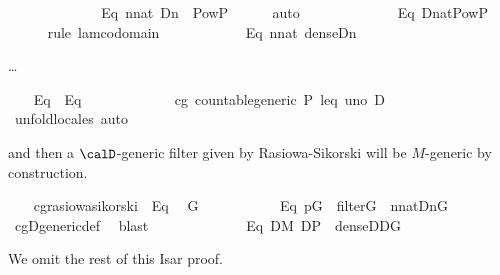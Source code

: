 \begin{isabellebody}
\isanewline
\ \ \isamarkupfalse%
\ \isanewline
\ \ \ \ \ \ \ \ \ Eq{}{\isacharcolon}\ {\isachardoublequoteopen}{\isasymforall}n{\isasymin}nat{\isachardot}\ {\isacharquery}D{\isacharbackquote}n\ {\isasymin}\ Pow{\isacharparenleft}P{\isacharparenright}{\isachardoublequoteclose}\isanewline
\ \ \ \ \isamarkupfalse%
\ auto\isanewline
\ \ \isamarkupfalse%
\ \isamarkupfalse%
\isanewline
\ \ \ \ \ \ \ \ \ Eq{}{\isacharcolon}\ {\isachardoublequoteopen}{\isacharquery}D{\isacharcolon}nat{\isasymrightarrow}Pow{\isacharparenleft}P{\isacharparenright}{\isachardoublequoteclose}\isanewline
\ \ \ \ \isamarkupfalse%
\ {\isacharparenleft}rule\ lam{\isacharunderscore}codomain{\isacharparenright}\isanewline
\ \ \isamarkupfalse%
\isanewline
\ \ \ \ \ \ \ \ \ Eq{}{\isacharcolon}\ {\isachardoublequoteopen}{\isasymforall}n{\isasymin}nat{\isachardot}\ dense{\isacharparenleft}{\isacharquery}D{\isacharbackquote}n{\isacharparenright}{\isachardoublequoteclose}
\end{isabellebody}
\dots
\begin{isabellebody}
\isanewline
\ \ \isamarkupfalse%
\ Eq{}\ \ Eq{}\ \isamarkupfalse%
\ \isanewline
\ \ \ \ \ \ \ \ \ \ cg{\isacharcolon}\ countable{\isacharunderscore}generic\ P\ leq\ uno\ {\isacharquery}D\ \isanewline
\ \ \ \ \isamarkupfalse%
\ {\isacharparenleft}unfold{\isacharunderscore}locales{\isacharcomma}\ auto{\isacharparenright}\isanewline
\end{isabellebody}
\noindent
and then a  $\calD$-generic filter given by Rasiowa-Sikorski will be $M$-generic by construction. 

\begin{isabellebody}
\isanewline
\ \ \isamarkupfalse%
\ cg{\isachardot}rasiowa{\isacharunderscore}sikorski\ \ Eq{}\ \isamarkupfalse%
\ G\ \ \isanewline
\ \ \ \ \ \ \ \ \ Eq{}{\isacharcolon}\ {\isachardoublequoteopen}p{\isasymin}G\ {\isasymand}\ filter{\isacharparenleft}G{\isacharparenright}\ {\isasymand}\ {\isacharparenleft}{\isasymforall}n{\isasymin}nat{\isachardot}{\isacharparenleft}{\isacharquery}D{\isacharbackquote}n{\isacharparenright}{\isasyminter}G{\isasymnoteq}{}{\isacharparenright}{\isachardoublequoteclose}\isanewline
\ \ \ \ \isamarkupfalse%
\ cg{\isachardot}D{\isacharunderscore}generic{\isacharunderscore}def\ \isamarkupfalse%
\ blast\isanewline
\ \ \isamarkupfalse%
\ \isamarkupfalse%
\isanewline
\ \ \ \ \ \ \ \ \ Eq{}{\isacharcolon}\ {\isachardoublequoteopen}{\isacharparenleft}{\isasymforall}D{\isasymin}M{\isachardot}\ D{\isasymsubseteq}P\ {\isasymand}\ dense{\isacharparenleft}D{\isacharparenright}{\isasymlongrightarrow}D{\isasyminter}G{\isasymnoteq}{}{\isacharparenright}{\isachardoublequoteclose}\isanewline
\end{isabellebody}

We omit the rest of this Isar proof.

